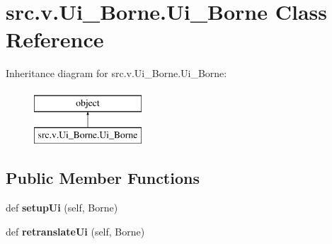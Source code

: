 \hypertarget{classsrc_1_1v_1_1_ui___borne_1_1_ui___borne}{}\section{src.\+v.\+Ui\+\_\+\+Borne.\+Ui\+\_\+\+Borne Class Reference}
\label{classsrc_1_1v_1_1_ui___borne_1_1_ui___borne}
Inheritance diagram for src.\+v.\+Ui\+\_\+\+Borne.\+Ui\+\_\+\+Borne\+:\begin{figure}[H]
\begin{center}
\leavevmode
\includegraphics[height=2.000000cm]{classsrc_1_1v_1_1_ui___borne_1_1_ui___borne}
\end{center}
\end{figure}
\subsection*{Public Member Functions}
\begin{DoxyCompactItemize}
\item 
\hypertarget{classsrc_1_1v_1_1_ui___borne_1_1_ui___borne_a342637a321df6a5b5806fd309360ba87}{}def {\bfseries setup\+Ui} (self, Borne)\label{classsrc_1_1v_1_1_ui___borne_1_1_ui___borne_a342637a321df6a5b5806fd309360ba87}

\item 
\hypertarget{classsrc_1_1v_1_1_ui___borne_1_1_ui___borne_af3dc117a351a58b96730c1b48a423c7d}{}def {\bfseries retranslate\+Ui} (self, Borne)\label{classsrc_1_1v_1_1_ui___borne_1_1_ui___borne_af3dc117a351a58b96730c1b48a423c7d}

\end{DoxyCompactItemize}
